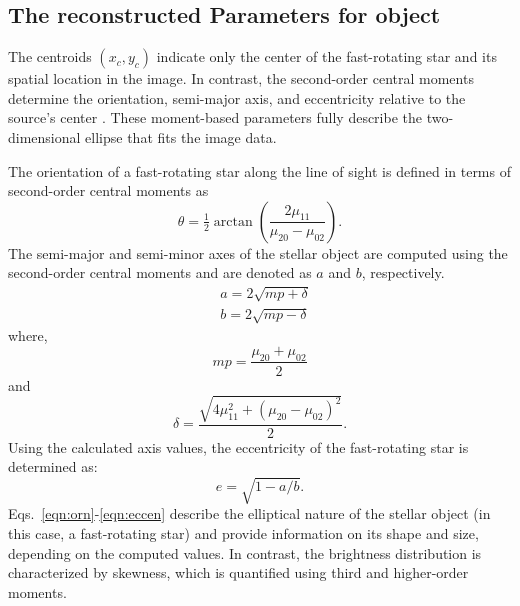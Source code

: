 \subsection{The reconstructed Parameters for object}
The centroids \((x_c, y_c)\) indicate only the center of the fast-rotating star and its spatial location in the image. In contrast, the second-order central moments determine the orientation, semi-major axis, and eccentricity relative to the source's center \citep{teague1980image}. These moment-based parameters fully describe the two-dimensional ellipse that fits the image data.

The orientation of a fast-rotating star along the line of sight is defined in terms of second-order central moments as
\begin{equation}
	\theta = \tfrac{1}{2}\arctan \left(\frac{2\mu_{11}}{\mu_{20} - \mu_{02}}\right).
	\label{eqn:orn}
\end{equation}
The semi-major and semi-minor axes of the stellar object are computed using the second-order central moments and are denoted as \(a\) and \(b\), respectively.
\begin{equation}
	\begin{aligned}
		&a = 2\sqrt{mp + \delta} \\
		&b = 2\sqrt{mp - \delta}
	\end{aligned}
	\label{eqn:semi}
\end{equation}
where,
\begin{equation}
	mp = \frac{\mu_{20} + \mu_{02}}{2}
	\label{eqn:mp}
\end{equation}
and
\begin{equation}
	\delta = \frac{\sqrt{4\mu_{11}^2 + (\mu_{20} - \mu_{02})^2}}{2}.	
	\label{eqn:delta}
\end{equation}
Using the calculated axis values, the eccentricity of the fast-rotating star is determined as:
\begin{equation}
	e = \sqrt{1 - a/b}.
	\label{eqn:eccen}
\end{equation}
Eqs.~\ref{eqn:orn}-\ref{eqn:eccen} describe the elliptical nature of the stellar object (in this case, a fast-rotating star) and provide information on its shape and size, depending on the computed values. In contrast, the brightness distribution is characterized by skewness, which is quantified using third and higher-order moments.
